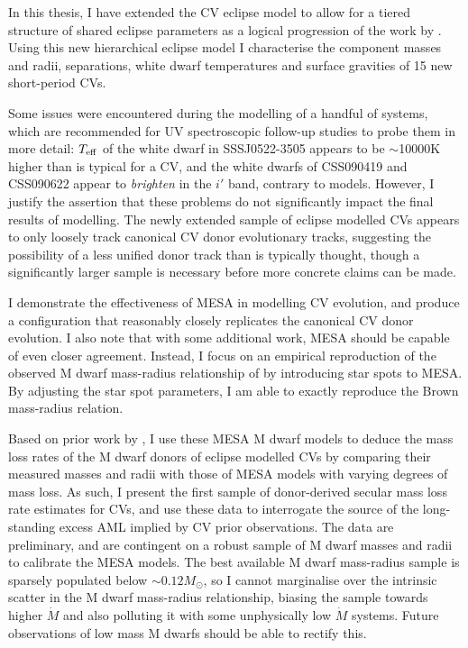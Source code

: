 \label{chpt:conclusion} %

In this thesis, I have extended the CV eclipse model to allow for a tiered structure of shared eclipse parameters as a logical progression of the work by \citet{McallisterThesis}.
Using this new hierarchical eclipse model I characterise the component masses and radii, separations, white dwarf temperatures and surface gravities of 15 new short-period CVs.

Some issues were encountered during the modelling of a handful of systems, which are recommended for UV spectroscopic follow-up studies to probe them in more detail: $T_{\rm eff}$ of the white dwarf in SSSJ0522-3505 appears to be $\sim$10000K higher than is typical for a CV, and the white dwarfs of CSS090419 and CSS090622 appear to \textit{brighten} in the $i'$ band, contrary to models.
However, I justify the assertion that these problems do not significantly impact the final results of modelling.
The newly extended sample of eclipse modelled CVs appears to only loosely track canonical CV donor evolutionary tracks, suggesting the possibility of a less unified donor track than is typically thought, though a significantly larger sample is necessary before more concrete claims can be made.

I demonstrate the effectiveness of MESA in modelling CV evolution, and produce a configuration that reasonably closely replicates the canonical CV donor evolution. I also note that with some additional work, MESA should be capable of even closer agreement.
Instead, I focus on an empirical reproduction of the observed M dwarf mass-radius relationship of \citet{brown2022} by introducing star spots to MESA. By adjusting the star spot parameters, I am able to exactly reproduce the Brown mass-radius relation.

Based on prior work by \citet{knigge2006,knigge11}, I use these MESA M dwarf models to deduce the mass loss rates of the M dwarf donors of eclipse modelled CVs by comparing their measured masses and radii with those of MESA models with varying degrees of mass loss.
As such, I present the first sample of donor-derived secular mass loss rate estimates for CVs, and use these data to interrogate the source of the long-standing excess AML implied by CV prior observations.
The data are preliminary, and are contingent on a robust sample of M dwarf masses and radii to calibrate the MESA models.
The best available M dwarf mass-radius sample is sparsely populated below $\sim 0.12 M_\odot$, so I cannot marginalise over the intrinsic scatter in the M dwarf mass-radius relationship, biasing the sample towards higher $\dot M$ and also polluting it with some unphysically low $\dot M$ systems. Future observations of low mass M dwarfs should be able to rectify this.

